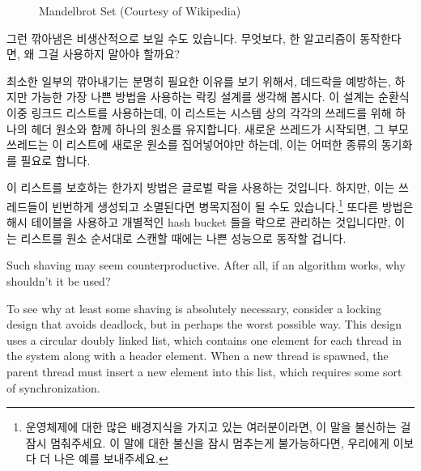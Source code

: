 \begin{figure}[htb]
\centering
{}
\caption{Mandelbrot Set (Courtesy of Wikipedia)}
\label{fig:easy:Mandelbrot Set}
\end{figure}

그런 깎아냄은 비생산적으로 보일 수도 있습니다.
무엇보다, 한 알고리즘이 동작한다면, 왜 그걸 사용하지 말아야 할까요?

최소한 일부의 깎아내기는 분명히 필요한 이유를 보기 위해서, 데드락을 예방하는,
하지만 가능한 가장 나쁜 방법을 사용하는 락킹 설계를 생각해 봅시다.
이 설계는 순환식 이중 링크드 리스트를 사용하는데, 이 리스트는 시스템 상의
각각의 쓰레드를 위해 하나의 헤더 원소와 함께 하나의 원소를 유지합니다.
새로운 쓰레드가 시작되면, 그 부모 쓰레드는 이 리스트에 새로운 원소를
집어넣어야만 하는데, 이는 어떠한 종류의 동기화를 필요로 합니다.

이 리스트를 보호하는 한가지 방법은 글로벌 락을 사용하는 것입니다.
하지만, 이는 쓰레드들이 빈번하게 생성되고 소멸된다면 병목지점이 될 수도
있습니다.\footnote{
	운영체제에 대한 많은 배경지식을 가지고 있는 여러분이라면, 이 말을
	불신하는 걸 잠시 멈춰주세요.
	이 말에 대한 불신을 잠시 멈추는게 불가능하다면, 우리에게 이보다 더 나은
	예를 보내주세요.}
또다른 방법은 해시 테이블을 사용하고 개별적인 hash bucket 들을 락으로 관리하는
것입니다만, 이는 리스트를 원소 순서대로 스캔할 때에는 나쁜 성능으로 동작할
겁니다.
\iffalse

Such shaving may seem counterproductive.
After all, if an algorithm works, why shouldn't it be used?

To see why at least some shaving is absolutely necessary, consider
a locking design that avoids deadlock, but in perhaps the worst possible way.
This design uses a circular doubly linked list, which contains one
element for each thread in the system along with a header element.
When a new thread is spawned, the parent thread must insert a new
element into this list, which requires some sort of synchronization.

